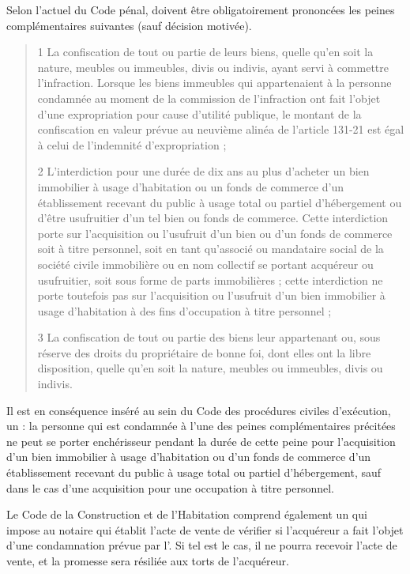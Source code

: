 			Selon l’actuel  du Code pénal, doivent être obligatoirement prononcées les peines
			complémentaires suivantes (sauf décision motivée).
			\begin{quote}
				1\degre{} La confiscation de tout ou partie de leurs biens, quelle qu'en soit la nature, meubles ou immeubles, divis
				ou indivis, ayant servi à commettre l'infraction. Lorsque les biens immeubles qui appartenaient à la
				personne condamnée au moment de la commission de l'infraction ont fait l'objet d'une expropriation pour
				cause d'utilité publique, le montant de la confiscation en valeur prévue au neuvième alinéa de l'article
				131-21 est égal à celui de l'indemnité d'expropriation ;
				
				2\degre{} L'interdiction pour une durée de dix ans au plus d'acheter un bien immobilier à usage d'habitation ou
				un fonds de commerce d'un établissement recevant du public à usage total ou partiel d'hébergement ou
				d'être usufruitier d'un tel bien ou fonds de commerce. Cette interdiction porte sur l'acquisition ou
				l'usufruit d'un bien ou d'un fonds de commerce soit à titre personnel, soit en tant qu'associé ou mandataire
				social de la société civile immobilière ou en nom collectif se portant acquéreur ou usufruitier, soit sous
				forme de parts immobilières ; cette interdiction ne porte toutefois pas sur l'acquisition ou l'usufruit d'un
				bien immobilier à usage d'habitation à des fins d'occupation à titre personnel ;
				
				3\degre{} La confiscation de tout ou partie des biens leur appartenant ou, sous réserve des droits du propriétaire
				de bonne foi, dont elles ont la libre disposition, quelle qu'en soit la nature, meubles ou immeubles, divis
				ou indivis.
			\end{quote}
			
			Il est en conséquence inséré au sein du Code des procédures civiles d'exécution, un  : la
			personne qui est condamnée à l'une des peines complémentaires précitées ne peut se porter enchérisseur
			pendant la durée de cette peine pour l'acquisition d'un bien immobilier à usage d'habitation ou d'un fonds
			de commerce d'un établissement recevant du public à usage total ou partiel d'hébergement, sauf dans le
			cas d'une acquisition pour une occupation à titre personnel.
			
			Le Code de la Construction et de l'Habitation comprend également un  qui impose au notaire
			qui établit l’acte de vente de vérifier si l’acquéreur a fait l’objet d’une condamnation prévue par l’. Si tel est le cas, il ne pourra recevoir l’acte de vente, et la promesse sera résiliée aux torts de
			l’acquéreur.

